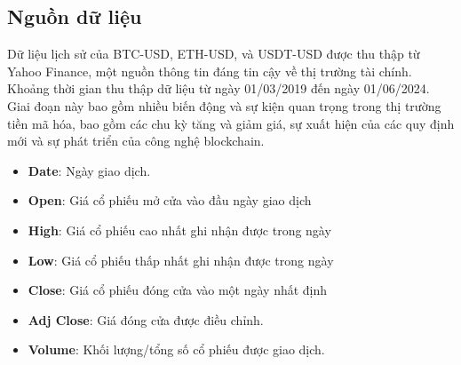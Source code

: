 \documentclass[conference]{IEEEtran}
\begin{document}
\subsection{Nguồn dữ liệu}
Dữ liệu lịch sử của BTC-USD, ETH-USD, và USDT-USD được thu thập từ Yahoo Finance, một nguồn thông tin đáng tin cậy về thị trường tài chính. Khoảng thời gian thu thập dữ liệu từ ngày 01/03/2019 đến ngày 01/06/2024. Giai đoạn này bao gồm nhiều biến động và sự kiện quan trọng trong thị trường tiền mã hóa, bao gồm các chu kỳ tăng và giảm giá, sự xuất hiện của các quy định mới và sự phát triển của công nghệ blockchain.

\begin{itemize}
    \item \textbf{Date}: Ngày giao dịch.
    \item \textbf{Open}: Giá cổ phiếu mở cửa vào đầu ngày giao dịch
    \item \textbf{High}: Giá cổ phiếu cao nhất ghi nhận được trong ngày
    \item \textbf{Low}: Giá cổ phiếu thấp nhất ghi nhận được trong ngày
    \item \textbf{Close}: Giá cổ phiếu đóng cửa vào một ngày nhất định
    \item \textbf{Adj Close}: Giá đóng cửa được điều chỉnh.
    \item \textbf{Volume}: Khối lượng/tổng số cổ phiếu được giao dịch.

\end{itemize}
\end{document}
